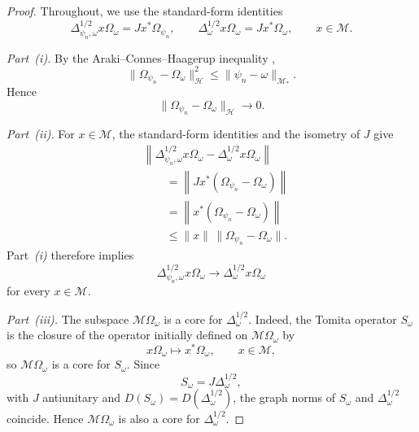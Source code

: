 \documentclass[11pt]{article}
\begin{document}
\begin{proof}
Throughout, we use the standard-form identities
\cite[Thm.~III.2.3]{brattelirobinson1}
\[
\Delta_{\psi_n,\omega}^{1/2}x\Omega_\omega
=
Jx^*\Omega_{\psi_n},
\qquad
\Delta_\omega^{1/2}x\Omega_\omega
=
Jx^*\Omega_\omega,
\qquad x\in\mathcal M.
\]

\medskip
\noindent
\emph{Part~(i).}
By the Araki--Connes--Haagerup inequality
\cite[Thm.~III.2.4]{brattelirobinson1},
\[
\|\Omega_{\psi_n}-\Omega_\omega\|_{\mathcal H}^2
\leq
\|\psi_n-\omega\|_{\mathcal M_*}.
\]
Hence
\[
\|\Omega_{\psi_n}-\Omega_\omega\|_{\mathcal H}
\longrightarrow0.
\]

\medskip
\noindent
\emph{Part~(ii).}
For $x\in\mathcal M$, the standard-form identities and the isometry of
$J$ give
\[
\begin{aligned}
&
\left\|
\Delta_{\psi_n,\omega}^{1/2}x\Omega_\omega
-
\Delta_\omega^{1/2}x\Omega_\omega
\right\|
\\
&\qquad
=
\left\|
Jx^*(\Omega_{\psi_n}-\Omega_\omega)
\right\|
\\
&\qquad
=
\left\|
x^*(\Omega_{\psi_n}-\Omega_\omega)
\right\|
\\
&\qquad
\leq
\|x\|\,
\|\Omega_{\psi_n}-\Omega_\omega\|.
\end{aligned}
\]
Part~\emph{(i)} therefore implies
\[
\Delta_{\psi_n,\omega}^{1/2}x\Omega_\omega
\longrightarrow
\Delta_\omega^{1/2}x\Omega_\omega
\]
for every $x\in\mathcal M$.

\medskip
\noindent
\emph{Part~(iii).}
The subspace $\mathcal M\Omega_\omega$ is a core for
$\Delta_\omega^{1/2}$. Indeed, the Tomita operator $S_\omega$ is the
closure of the operator initially defined on $\mathcal M\Omega_\omega$
by
\[
x\Omega_\omega\longmapsto x^*\Omega_\omega,
\qquad x\in\mathcal M,
\]
so $\mathcal M\Omega_\omega$ is a core for $S_\omega$. Since
\[
S_\omega=J\Delta_\omega^{1/2},
\]
with $J$ antiunitary and
$D(S_\omega)=D(\Delta_\omega^{1/2})$, the graph norms of
$S_\omega$ and $\Delta_\omega^{1/2}$ coincide. Hence
$\mathcal M\Omega_\omega$ is also a core for
$\Delta_\omega^{1/2}$.


\end{proof}
\end{document}
